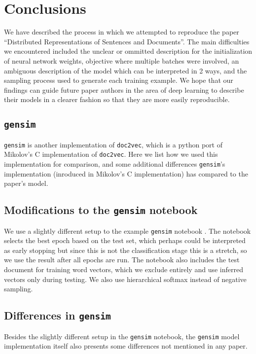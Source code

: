 \documentclass{article}
\begin{document}
\section{Conclusions}
We have described the process in which we attempted to reproduce the paper ``Distributed Representations of Sentences and Documents''. The main difficulties we encountered included the unclear or ommitted description for the initialization of neural network weights, objective where multiple batches were involved, an ambiguous description of the model which can be interpreted in 2 ways, and the sampling process used to generate each training example. We hope that our findings can guide future paper authors in the area of deep learning to describe their models in a clearer fashion so that they are more easily reproducible.

\begin{appendices}
\section{\texttt{gensim}} \label{sec:gensim}
\texttt{gensim} is another implementation of \texttt{doc2vec}, which is a python port of Mikolov's C implementation of \texttt{doc2vec}. Here we list how we used this implementation for comparison, and some additional differences \texttt{gensim}'s implementation (inroduced in Mikolov's C implementation) has compared to the paper's model.

\subsection{Modifications to the \texttt{gensim} notebook}
We use a slightly different setup to the example \texttt{gensim} notebook \citep{mohr_gensim_2017}. The notebook selects the best epoch based on the test set, which perhaps could be interpreted as early stopping but since this is not the classification stage this is a stretch, so we use the result after all epochs are run. The notebook also includes the test document for training word vectors, which we exclude entirely and use inferred vectors only during testing. We also use hierarchical softmax instead of negative sampling.

\subsection{Differences in \texttt{gensim}}
Besides the slightly different setup in the \texttt{gensim} notebook, the \texttt{gensim} model implementation itself also presents some differences not mentioned in any paper.


\end{appendices}
\end{document}
